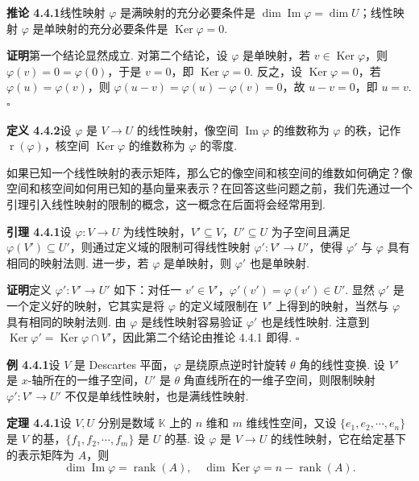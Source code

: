 \documentclass[UTF8, 12pt, fontset=fandol, oneside]{ctexart}
\begin{document}
\noindent\textbf{推论 4.4.1}\quad 线性映射 $\varphi$ 是满映射的充分必要条件是 $\dim\operatorname{Im}\varphi=\dim U$；线性映射 $\varphi$ 是单映射的充分必要条件是 $\operatorname{Ker}\varphi=0$.

\noindent\textbf{证明}\quad 第一个结论显然成立. 对第二个结论，设 $\varphi$ 是单映射，若 $v\in\operatorname{Ker}\varphi$，则 $\varphi(v)=0=\varphi(0)$，于是 $v=0$，即 $\operatorname{Ker}\varphi=0$. 反之，设 $\operatorname{Ker}\varphi=0$，若 $\varphi(u)=\varphi(v)$，则 $\varphi(u-v)=\varphi(u)-\varphi(v)=0$，故 $u-v=0$，即 $u=v$. $\square$

\noindent\textbf{定义 4.4.2}\quad 设 $\varphi$ 是 $V\to U$ 的线性映射，像空间 $\operatorname{Im}\varphi$ 的维数称为 $\varphi$ 的秩，记作 $\operatorname{r}(\varphi)$，核空间 $\operatorname{Ker}\varphi$ 的维数称为 $\varphi$ 的零度.

如果已知一个线性映射的表示矩阵，那么它的像空间和核空间的维数如何确定？像空间和核空间如何用已知的基向量来表示？在回答这些问题之前，我们先通过一个引理引入线性映射的限制的概念，这一概念在后面将会经常用到.

\noindent\textbf{引理 4.4.1}\quad 设 $\varphi:V\to U$ 为线性映射，$V'\subseteq V$，$U'\subseteq U$ 为子空间且满足 $\varphi(V')\subseteq U'$，则通过定义域的限制可得线性映射 $\varphi':V'\to U'$，使得 $\varphi'$ 与 $\varphi$ 具有相同的映射法则. 进一步，若 $\varphi$ 是单映射，则 $\varphi'$ 也是单映射.

\noindent\textbf{证明}\quad 定义 $\varphi':V'\to U'$ 如下：对任一 $v'\in V'$，$\varphi'(v')=\varphi(v')\in U'$. 显然 $\varphi'$ 是一个定义好的映射，它其实是将 $\varphi$ 的定义域限制在 $V'$ 上得到的映射，当然与 $\varphi$ 具有相同的映射法则. 由 $\varphi$ 是线性映射容易验证 $\varphi'$ 也是线性映射. 注意到 $\operatorname{Ker}\varphi'=\operatorname{Ker}\varphi\cap V'$，因此第二个结论由推论 4.4.1 即得. $\square$

\noindent\textbf{例 4.4.1}\quad 设 $V$ 是 Descartes 平面，$\varphi$ 是绕原点逆时针旋转 $\theta$ 角的线性变换. 设 $V'$ 是 $x$-轴所在的一维子空间，$U'$ 是 $\theta$ 角直线所在的一维子空间，则限制映射 $\varphi':V'\to U'$ 不仅是单线性映射，也是满线性映射.

\noindent\textbf{定理 4.4.1}\quad 设 $V,U$ 分别是数域 $\mathbb{K}$ 上的 $n$ 维和 $m$ 维线性空间，又设 $\{e_1,e_2,\cdots,e_n\}$ 是 $V$ 的基，$\{f_1,f_2,\cdots,f_m\}$ 是 $U$ 的基. 设 $\varphi$ 是 $V\to U$ 的线性映射，它在给定基下的表示矩阵为 $A$，则
\[
\dim\operatorname{Im}\varphi=\operatorname{rank}(A),\quad \dim\operatorname{Ker}\varphi=n-\operatorname{rank}(A).
\]
\end{document}
